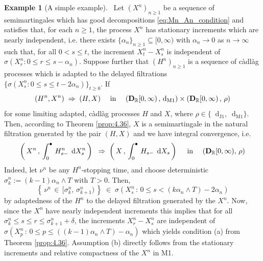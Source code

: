 \documentclass[11pt]{article}
\theoremstyle{definition}\newtheorem{example}[theorem]{Example}
\theoremstyle{definition}\newtheorem{counterexample}[theorem]{Counterexample}
\theoremstyle{definition}\newtheorem{remark}[theorem]{Remark}
\theoremstyle{definition}\newtheorem{defi}[theorem]{Definition}
\numberwithin{equation}{section}
\newcommand{\R}{\mathbb{R}}
\newcommand{\D}{{\bf D}}											%
\newcommand*\diff{\mathop{}\!\mathrm{d}}								%
\renewcommand{\|}{\; : \, \;}											%
\newcommand{\dJ}{\diff_{\operatorname{J1}}}								%
\newcommand{\dM}{\diff_{\operatorname{M1}}}							%
\begin{document}
\begin{example}[A simple example]\ 
	Let $(X^n)_{n\ge 1}$ be a sequence of semimartingales which has good decompositions \eqref{eq:Mn_An_condition} and satisfies that, for each $n\ge 1$, the process $X^n$ has stationary increments which are nearly independent, i.e. there exists $\{\alpha_n\}_{n \ge 1} \subseteq [0,\infty)$ with $\alpha_n \to 0$ as $n\to \infty$ such that, for all $0<s\le t$, the increment $X^n_t-X^n_s$ is independent of $\sigma(X^n_r : 0\le r \le s-\alpha_n)$. Suppose further that $(H^n)_{n\ge 1}$ is a sequence of càdlàg processes which is adapted to the delayed filtrations $ \{ \sigma(X^n_s : 0\le s \le t-2\alpha_n)\}_{t\ge 0}$. If 
	$$(H^n,X^n) \; \Rightarrow \; (H,X)  \quad \text{ in } \quad (\D_{\R}[0,\infty) \, , \, \dM )\times (\D_{\R}[0,\infty) \, , \, \rho)$$
	for some limiting adapted, càdlàg processes $H$ and $X$, where $\rho \in \{\dJ,\dM\}$. Then, according to Theorem \ref{prop:4.36}, $X$ is a semimartingale in the natural filtration generated by the pair $(H, X)$ and we have integral convergence, i.e.
	$$\left( \, X^n \, , \, \int_0^\bullet \, H^n_{s-} \; \diff X^n_s\, \right) \;  \; \Rightarrow \; \left( \, X \, , \, \int_0^\bullet \, H_{s-} \; \diff X_s\, \right) \quad \text{ in } \quad (\D_{\R}[0,\infty), \, \rho)$$
	Indeed, let $\nu^n$ be any $H^n$-stopping time, and choose deterministic $\sigma_k^n:= (k-1)\alpha_n \wedge T$ with $T>0$. Then,
	$$ \left\{ \, \nu^n \, \in \, [\sigma_k^n, \, \sigma^n_{k+1}) \, \right\} \; \in \; \sigma(X^n_s \, : \, 0 \le s < (k \alpha_n \wedge T)-2\alpha_n)$$
	by adaptedness of the $H^n$ to the delayed filtration generated by the $X^n$. Now, since the $X^n$ have nearly independent increments this implies that for all $\sigma_{k}^n \le s \le r \le \sigma^n_{k+1}+\delta$, the increments $X^n_r-X^n_s$ are independent of $\sigma(X^n_p \, : \, 0 \le p \le ((k-1) \alpha_n \wedge T)-\alpha_n)$
	which yields condition (a) from Theorem \ref{prop:4.36}. Assumption (b) directly follows from the stationary increments and relative compactness of the $X^n$ in M1.
\end{example}
\end{document}
